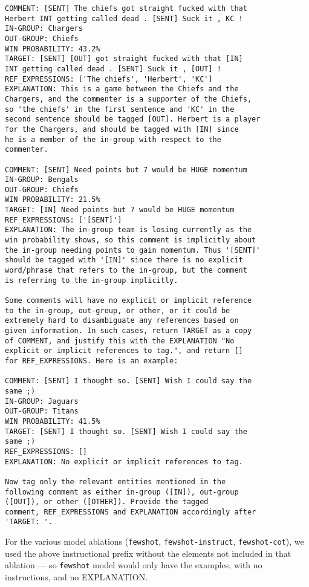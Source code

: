 \begin{verbatim}
COMMENT: [SENT] The chiefs got straight fucked with that 
Herbert INT getting called dead . [SENT] Suck it , KC !	
IN-GROUP: Chargers
OUT-GROUP: Chiefs
WIN PROBABILITY: 43.2%
TARGET: [SENT] [OUT] got straight fucked with that [IN] 
INT getting called dead . [SENT] Suck it , [OUT] !
REF_EXPRESSIONS: ['The chiefs', 'Herbert', 'KC']
EXPLANATION: This is a game between the Chiefs and the 
Chargers, and the commenter is a supporter of the Chiefs, 
so 'the chiefs' in the first sentence and 'KC' in the 
second sentence should be tagged [OUT]. Herbert is a player 
for the Chargers, and should be tagged with [IN] since 
he is a member of the in-group with respect to the 
commenter.

COMMENT: [SENT] Need points but 7 would be HUGE momentum
IN-GROUP: Bengals
OUT-GROUP: Chiefs
WIN PROBABILITY: 21.5%
TARGET: [IN] Need points but 7 would be HUGE momentum
REF_EXPRESSIONS: ['[SENT]']
EXPLANATION: The in-group team is losing currently as the 
win probability shows, so this comment is implicitly about 
the in-group needing points to gain momentum. Thus '[SENT]' 
should be tagged with '[IN]' since there is no explicit 
word/phrase that refers to the in-group, but the comment 
is referring to the in-group implicitly.

Some comments will have no explicit or implicit reference 
to the in-group, out-group, or other, or it could be 
extremely hard to disambiguate any references based on 
given information. In such cases, return TARGET as a copy 
of COMMENT, and justify this with the EXPLANATION "No 
explicit or implicit references to tag.", and return [] 
for REF_EXPRESSIONS. Here is an example:

COMMENT: [SENT] I thought so. [SENT] Wish I could say the 
same ;)
IN-GROUP: Jaguars
OUT-GROUP: Titans
WIN PROBABILITY: 41.5%
TARGET: [SENT] I thought so. [SENT] Wish I could say the 
same ;)
REF_EXPRESSIONS: []
EXPLANATION: No explicit or implicit references to tag.

Now tag only the relevant entities mentioned in the 
following comment as either in-group ([IN]), out-group 
([OUT]), or other ([OTHER]). Provide the tagged 
comment, REF_EXPRESSIONS and EXPLANATION accordingly after 
'TARGET: '.
\end{verbatim}

For the various model ablations (\texttt{fewshot}, \texttt{fewshot-instruct}, \texttt{fewshot-cot}), we used the above instructional prefix without the elements not included in that ablation --- so \texttt{fewshot} model would only have the examples, with no instructions, and no EXPLANATION.
